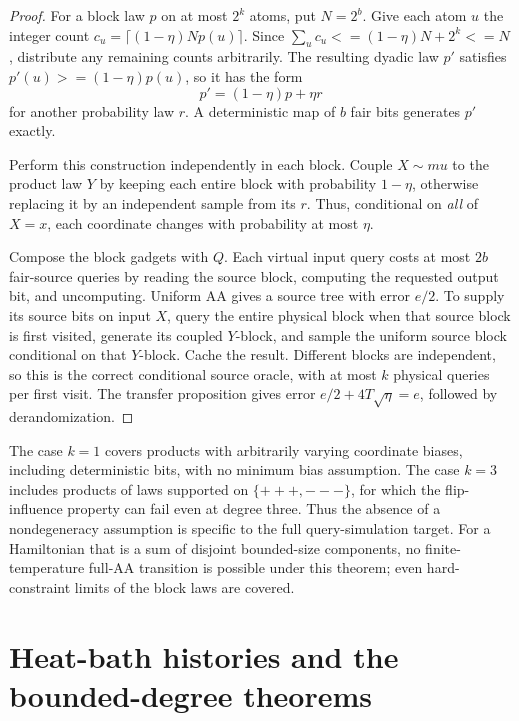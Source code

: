 \documentclass[11pt]{article}
\theoremstyle{definition}
\theoremstyle{remark}
\def\mu{mu}\def\rho{rho}\def\le{<=}\def\ge{>=}%
\begin{document}
\begin{proof}
For a block law \(p\) on at most \(2^k\) atoms, put \(N=2^b\).
Give each atom \(u\) the integer count
\(c_u=\lceil(1-\eta)Np(u)\rceil\). Since
\(\sum_uc_u\le(1-\eta)N+2^k\le N\), distribute any remaining
counts arbitrarily. The resulting dyadic law \(p'\) satisfies
\(p'(u)\ge(1-\eta)p(u)\), so it has the form
\[
 p'=(1-\eta)p+\eta r
\]
for another probability law \(r\). A deterministic map of \(b\)
fair bits generates \(p'\) exactly.

Perform this construction independently in each block. Couple
\(X\sim\mu\) to the product law \(Y\) by keeping each entire block
with probability \(1-\eta\), otherwise replacing it by an independent
sample from its \(r\). Thus, conditional on \emph{all} of \(X=x\),
each coordinate changes with probability at most \(\eta\).

Compose the block gadgets with \(Q\). Each virtual input query costs
at most \(2b\) fair-source queries by reading the source block,
computing the requested output bit, and uncomputing. Uniform AA gives
a source tree with error \(e/2\). To supply its source bits on input
\(X\), query the entire physical block when that source block is first
visited, generate its coupled \(Y\)-block, and sample the uniform
source block conditional on that \(Y\)-block. Cache the result.
Different blocks are independent, so this is the correct conditional
source oracle, with at most \(k\) physical queries per first visit.
The transfer proposition gives error
\(e/2+4T\sqrt\eta=e\), followed by derandomization.
\end{proof}

The case \(k=1\) covers products with arbitrarily varying coordinate
biases, including deterministic bits, with no minimum bias assumption.
The case \(k=3\) includes products of laws supported on
\(\{+++ ,---\}\), for which the flip-influence property can fail even
at degree three. Thus the absence of a nondegeneracy assumption is
specific to the full query-simulation target. For a Hamiltonian that
is a sum of disjoint bounded-size components, no finite-temperature
full-AA transition is possible under this theorem; even hard-constraint
limits of the block laws are covered.

\section{Heat-bath histories and the bounded-degree theorems}

\end{document}
